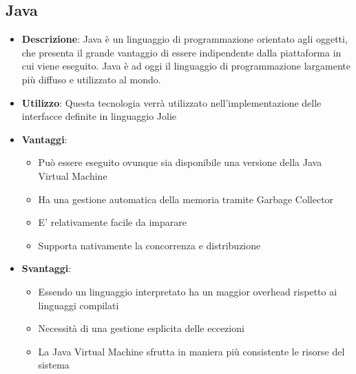 \subsection{Java}
\begin{itemize}
	\item \textbf{Descrizione}: Java è un linguaggio di programmazione orientato agli oggetti, che presenta il grande vantaggio di essere indipendente dalla piattaforma in cui viene eseguito. Java è ad oggi il linguaggio di programmazione largamente più diffuso e utilizzato al mondo.
	\item \textbf{Utilizzo}: Questa tecnologia verrà utilizzato nell'implementazione delle interfacce definite in linguaggio Jolie
	\item \textbf{Vantaggi}:
	\begin{itemize}
		\item Può essere eseguito ovunque sia disponibile una versione della Java Virtual Machine
		\item Ha una gestione automatica della memoria tramite Garbage Collector
		\item E' relativamente facile da imparare
		\item Supporta nativamente la concorrenza e distribuzione
	\end{itemize}
	\item \textbf{Svantaggi}:
	\begin{itemize}
		\item Essendo un linguaggio interpretato ha un maggior overhead rispetto ai linguaggi compilati
		\item Necessità di una gestione esplicita delle eccezioni
		\item La Java Virtual Machine sfrutta in maniera più consistente le risorse del sistema
	\end{itemize}
\end{itemize}

